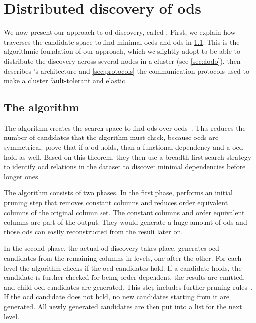 
\section{Distributed discovery of \glspl{od}}\label{sec:approach}

  We now present our approach to \gls{od} discovery, called \dodo{}.
  First, we explain how \ocddiscover{}~\cite{consonni} traverses the candidate space to find minimal \glspl{ocd} and \glspl{od} in \cref{sec:ocddiscover}.
  This is the algorithmic foundation of our approach, which we slightly adopt to be able to distribute the discovery across several nodes in a cluster (see \cref{sec:dodo}).
   then describes \dodo{}'s architecture and \cref{sec:protocols} the communication protocols used to make a \dodo{} cluster fault-tolerant and elastic.
 
\subsection{The \ocddiscover{} algorithm}\label{sec:ocddiscover}

  The \ocddiscover{} algorithm creates the search space to find \glspl{od} over \glspl{ocd}~\cite{consonni}.
  This reduces the number of candidates that the algorithm must check, because \glspl{ocd} are symmetrical.
   prove that if a \gls{od} holds, than a functional dependency and a \gls{ocd} hold as well.
  Based on this theorem, they then use a breadth-first search strategy to identify \gls{ocd} relations in the dataset to discover minimal dependencies before longer ones.

  The \ocddiscover{} algorithm consists of two phases.
  In the first phase, \ocddiscover{} performs an initial pruning step that removes constant columns and reduces order equivalent columns of the original column set.
  The constant columns and order equivalent columns are part of the output.
  They would generate a huge amount of \glspl{od} and those \glspl{od} can easily reconstructed from the result later on.

  In the second phase, the actual \gls{od} discovery takes place.
  \ocddiscover{} generates \gls{ocd} candidates from the remaining columns in levels, one after the other.
  For each level the algorithm checks if the \gls{ocd} candidates hold.
  If a candidate holds, the candidate is further checked for being order dependent, the results are emitted, and child \gls{ocd} candidates are generated.
  This step includes further pruning rules~\cite{consonni}.
  If the \gls{ocd} candidate does not hold, no new candidates starting from it are generated.
  All newly generated candidates are then put into a list for the next level.

